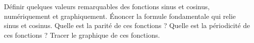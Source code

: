 %
%
	\begin{tasks}
		\task Définir quelques valeurs remarquables des fonctions sinus et cosinus, numériquement et graphiquement.
		\task Énoncer la formule fondamentale qui relie sinus et cosinus.
		\task Quelle est la parité de ces fonctions ?
		\task Quelle est la périodicité de ces fonctions ?
		\task Tracer le graphique de ces fonctions.
	\end{tasks}
